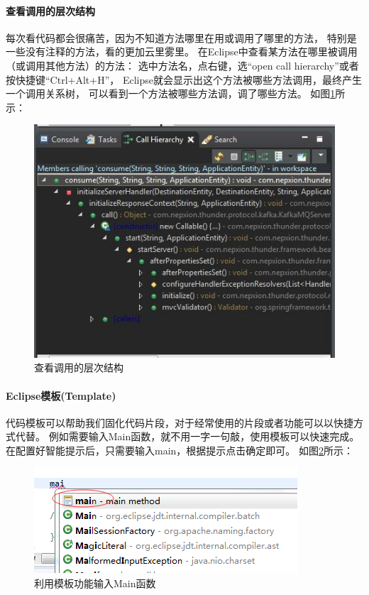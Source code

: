 \documentclass{book}
\begin{document}
\paragraph{查看调用的层次结构}

每次看代码都会很痛苦，因为不知道方法哪里在用或调用了哪里的方法，
特别是一些没有注释的方法，看的更加云里雾里。
在Eclipse中查看某方法在哪里被调用（或调用其他方法）的方法：
选中方法名，点右键，选“open call hierarchy”或者按快捷键“Ctrl+Alt+H”，
Eclipse就会显示出这个方法被哪些方法调用，最终产生一个调用关系树，
可以看到一个方法被哪些方法调，调了哪些方法。
如图\ref{code:JavaMethodCallHierarchyView}所示：

\begin{figure}[htbp]
	\centering
	\includegraphics[scale=0.5]{JavaMethodCallHierarchyView.jpg}
	\caption{查看调用的层次结构}
	\label{code:JavaMethodCallHierarchyView}
\end{figure}

\paragraph{Eclipse模板(Template)}

代码模板可以帮助我们固化代码片段，对于经常使用的片段或者功能可以以快捷方式代替。
例如需要输入Main函数，就不用一字一句敲，使用模板可以快速完成。
在配置好智能提示后，只需要输入main，根据提示点击确定即可。
如图\ref{fig:TemplateInputMainMethod}所示：

\begin{figure}[htbp]
	\centering
	\includegraphics[scale=0.6]{TemplateInputMainMethod.png}
	\caption{利用模板功能输入Main函数}
	\label{fig:TemplateInputMainMethod}
\end{figure}
\end{document}
